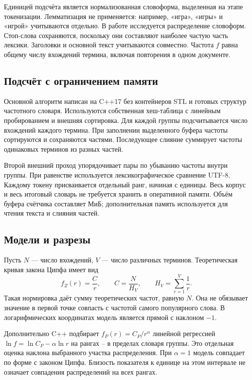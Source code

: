 \documentclass[12pt,a4paper]{article}
\begin{document}
Единицей подсчёта является нормализованная словоформа, выделенная на этапе
токенизации. Лемматизация не применяется: например, «игра», «игры» и «игрой»
учитываются отдельно. В работе исследуется распределение словоформ.
Стоп-слова сохраняются, поскольку они составляют наиболее частую часть
лексики. Заголовки и основной текст учитываются совместно.
Частота $f$ равна общему числу вхождений термина, включая повторения
в одном документе.

\subsection{Подсчёт с ограничением памяти}
Основной алгоритм написан на C++17 без контейнеров STL и готовых структур
частотного словаря. Используются собственная хеш-таблица с линейным
пробированием и внешняя сортировка. Для каждой группы подсчитывается число
вхождений каждого термина. При заполнении выделенного буфера частоты
сортируются и сохраняются частями. Последующее слияние суммирует частоты
одинаковых терминов из разных частей.

Второй внешний проход упорядочивает пары по убыванию частоты внутри группы.
При равенстве используется лексикографическое сравнение UTF-8. Каждому
токену присваивается отдельный ранг, начиная с единицы. Весь корпус и весь
итоговый словарь не требуется хранить в оперативной памяти.
Объём буфера счётчика составляет \ZipfMemory{} МиБ; дополнительная память
используется для чтения текста и слияния частей.

\subsection{Модели и разрезы}
Пусть $N$ --- число вхождений, $V$ --- число различных терминов.
Теоретическая кривая закона Ципфа имеет вид
\[
 f_Z(r)=\frac{C}{r},\qquad C=\frac{N}{H_V},\qquad
 H_V=\sum_{r=1}^{V}\frac1r.
\]
Такая нормировка даёт сумму теоретических частот, равную $N$.
Она не обязывает значение в первой точке совпасть с частотой самого
популярного слова. В логарифмических координатах модель является прямой
с наклоном $-1$.

Дополнительно C++ подбирает $f_P(r)=C_P/r^\alpha$ линейной регрессией
$\ln f=\ln C_P-\alpha\ln r$ на рангах
\ZipfFitMin{}--\ZipfFitMax{} в пределах словаря группы. Это отдельная
оценка наклона выбранного участка распределения. При $\alpha=1$ модель
совпадает по форме с законом Ципфа. Близость показателя к единице на этом
интервале не означает совпадения распределений на всех рангах.
\end{document}
